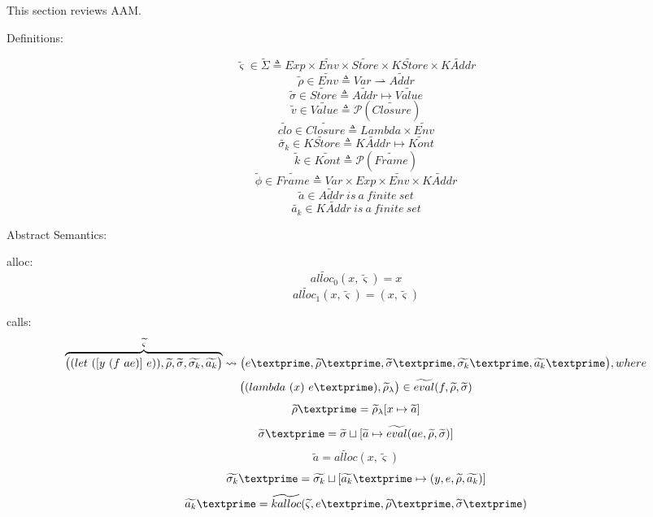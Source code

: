 \documentclass{article}
\begin{document}
This section reviews AAM\@.

Definitions:

\[
\tag{states}
\widetilde{\varsigma}\in\widetilde{\Sigma} \triangleq Exp \times \widetilde{Env} \times \widetilde{Store}
\times \widetilde{KStore} \times \widetilde{KAddr}
\]
\[
\tag{environments}
\widetilde{\rho} \in \widetilde{Env} \triangleq Var \rightharpoonup \widetilde{Addr}
\]
\[
\tag{srores}
\widetilde{\sigma} \in \widetilde{Store} \triangleq \widetilde{Addr} \mapsto \widetilde{Value}
\]
\[
\tag{abstract values}
\widetilde{v} \in \widetilde{Value} \triangleq \mathcal{P}(\widetilde{Closure})
\]
\[
\tag{closures}
\widetilde{clo} \in \widetilde{Closure} \triangleq Lambda \times \widetilde{Env}
\]
\[
\tag{continuation stores}
\widetilde{\sigma_k} \in \widetilde{KStore} \triangleq  \widetilde{KAddr} \mapsto  \widetilde{Kont}
\]
\[
\tag{abstract continuations}
\widetilde{k} \in  \widetilde{Kont} \triangleq  \mathcal{P}(\widetilde{Frame})
\]
\[
\tag{stack frames}
\widetilde{\phi} \in  \widetilde{Frame} \triangleq Var \times Exp \times  \widetilde{Env} \times  \widetilde{KAddr}
\]
\[
\tag{value addresses}
\widetilde{a} \in \widetilde{Addr} \ is\ a\ finite\ set
\]
\[
\tag{continuation addresses}
\widetilde{a_k} \in \widetilde{KAddr} \ is\ a\ finite\ set
\]

Abstract Semantics:

alloc:
\[
\widetilde{alloc_0} (x, \widetilde{\varsigma}) = x
\]
\[
\widetilde{alloc_1} (x, \widetilde{\varsigma}) = (x, \widetilde{\varsigma})
\]

calls:
\[
\overbrace{
\big((let\ ([y\ (f\ ae)]\ e)), \widetilde{\rho}, \widetilde{\sigma}, \widetilde{\sigma_k}, \widetilde{a_k} \big)
}^{\widetilde{\varsigma}}
\leadsto \big(e\textprime,\widetilde{\rho}\textprime, \widetilde{\sigma}\textprime, \widetilde{\sigma_k}\textprime, \widetilde{a_k}\textprime \big), where
\]
\[
\big((lambda\ (x)\ e\textprime), \widetilde{\rho}_{\lambda}  \big) \in \widetilde{eval}(f, \widetilde{\rho}, \widetilde{\sigma})
\]
\[
\widetilde{\rho}\textprime = \widetilde{\rho}_{\lambda}[x \mapsto \widetilde{a}]
\]
\[
\widetilde{\sigma}\textprime = \widetilde{\sigma} \sqcup [\widetilde{a} \mapsto \widetilde{eval}(ae, \widetilde{\rho}, \widetilde{\sigma})]
\]
\[
\widetilde{a} = \widetilde{alloc}(x, \widetilde{\varsigma})
\]
\[
\widetilde{\sigma_k}\textprime = \widetilde{\sigma_k} \sqcup [\widetilde{a_k}\textprime \mapsto {(y, e, \widetilde{\rho}, \widetilde{a_k})}]
\]
\[
\widetilde{a_k}\textprime = \widetilde{kalloc}(\widetilde{\varsigma}, e\textprime, \widetilde{\rho}\textprime, \widetilde{\sigma}\textprime)
\]
\end{document}
